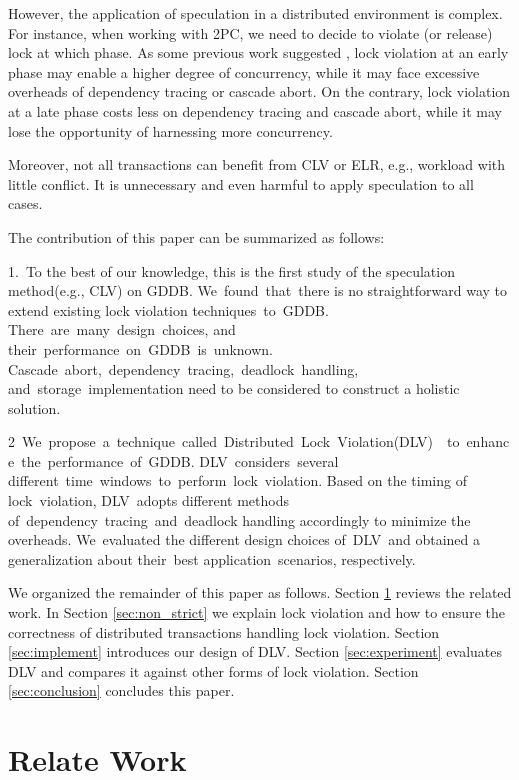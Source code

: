 \documentclass[conference]{IEEEtran}
\begin{document}
However, the application of speculation in a distributed environment is complex.
For instance, when working with 2PC, we need to decide to violate (or release) lock at which phase.
As some previous work suggested \cite{CLV:conf/sigmod/GraefeLKTV13}, lock violation at an early phase may enable a higher degree of concurrency,
while it may face excessive overheads of dependency tracing or cascade abort.
On the contrary, lock violation at a late phase costs less on dependency tracing and cascade abort,
while it may lose the opportunity of harnessing more concurrency.

Moreover, not all transactions can benefit from CLV or ELR, e.g., workload with little conflict.
It is unnecessary and even harmful to apply speculation to all cases.

The contribution of this paper can be summarized as follows:

  

1. To the best of our knowledge, this is the first study of the speculation method(e.g., CLV) on GDDB.
We found that there is no straightforward way to extend existing lock violation techniques to GDDB. 
There are many design choices, and their performance on GDDB is unknown. 
Cascade abort, dependency tracing, deadlock handling, and storage implementation need to be considered to construct a holistic solution.  

2 We propose a technique called Distributed Lock Violation(DLV)  to enhance the performance of GDDB.
DLV considers several different time windows to perform lock violation.
Based on the timing of lock violation, DLV adopts different methods of dependency tracing and deadlock handling accordingly to minimize the overheads.
We evaluated the different design choices of DLV and obtained a generalization about their best application scenarios, respectively.

We organized the remainder of this paper as follows.
Section \ref{sec:relate_work} reviews the related work.
In Section \ref{sec:non_strict} we explain lock violation and how to ensure the correctness of distributed transactions handling lock violation.
Section \ref{sec:implement} introduces our design of DLV.
Section \ref{sec:experiment} evaluates DLV and compares it against other forms of lock violation.
Section \ref{sec:conclusion} concludes this paper.


\section{Relate Work}
\label{sec:relate_work}
\end{document}
